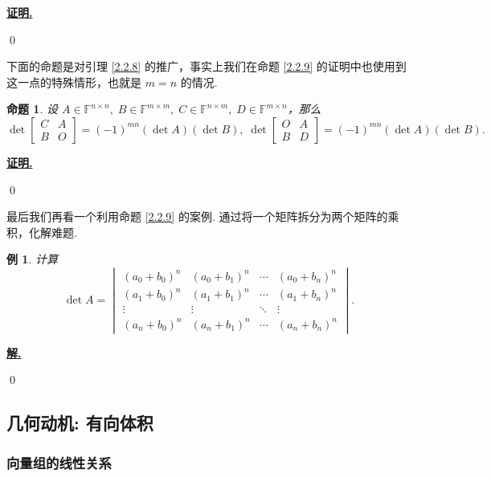 \documentclass[10pt,openany]{article}
\theoremstyle{thmstyle} %
\theoremstyle{defstyle} %
\theoremstyle{prostyle} %
\newtheorem{proposition}[theorem]{命题}
\theoremstyle{exastyle}
\newtheorem{example}[theorem]{例}
\theoremstyle{remstyle}
\renewenvironment{proof}[1][证明]{\par\underline{\textbf{#1.}} \;\fangsong}{\qed\par}
\newenvironment{solution}{\par\underline{\textbf{解.}} \;\fangsong}{\qed\par}
\newcommand{\F}{\mathbb{F}}
\newcommand{\n}{^{n \times n}}
\newcommand{\mn}{^{m \times n}}
\newcommand{\nm}{^{n \times m}}
\begin{document}
\begin{proof}
	
\end{proof}

下面的命题是对引理 \ref{2.2.8} 的推广，事实上我们在命题 \ref{2.2.9} 的证明中也使用到这一点的特殊情形，也就是 \( m=n \) 的情况. 

\begin{proposition}
    设 \( A \in \F\n, \; B \in \F^{m \times m}, \; C \in \F\nm, \; D \in \F\mn \)，那么
    \[ 
    \det\begin{bmatrix} 
    	C & A \\
    	 B & O 
    	\end{bmatrix}= (-1)^{mn} (\det A)(\det B), \; 
    \det\begin{bmatrix} 
    	O & A \\
    	 B & D
    \end{bmatrix}= (-1)^{mn} (\det A)(\det B). \]
\end{proposition}

\begin{proof}
	
\end{proof}

最后我们再看一个利用命题 \ref{2.2.9} 的案例. 通过将一个矩阵拆分为两个矩阵的乘积，化解难题.

\begin{example}
	计算
	\[ \det A = \begin{vmatrix}
		(a_0 + b_0)^n & (a_0 + b_1)^n & \cdots & (a_0 + b_n)^n \\
		(a_1 + b_0)^n & (a_1 + b_1)^n & \cdots & (a_1 + b_n)^n \\
		\vdots & \vdots & \ddots & \vdots \\
		(a_n + b_0)^n & (a_n + b_1)^n & \cdots & (a_n + b_n)^n
	\end{vmatrix}. \]
\end{example}

\begin{solution}
	
\end{solution}

\subsection{几何动机: 有向体积}
\label{2.3}

\subsubsection{向量组的线性关系}
\end{document}
